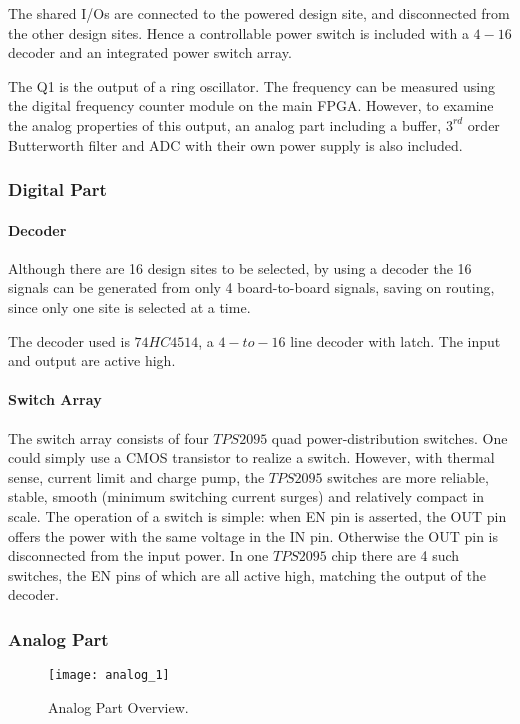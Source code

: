 The shared I/Os are connected to the powered design site, and disconnected from the other
design sites. Hence a controllable power switch is included with a $4-16$ decoder and an
integrated power switch array.

The Q1 is the output of a ring oscillator. The frequency can be measured using the digital
frequency counter module on the main FPGA. However, to examine the analog properties of this output,
an analog part including a buffer, $3^{rd}$ order Butterworth filter and ADC with their own power supply is also included.


\subsubsection{Digital Part}

\paragraph{Decoder}

Although there are 16 design sites to be selected, by using a decoder the 16
signals can be generated from only 4 board-to-board signals, saving on routing, since only one
site is selected at a time.

The decoder used is $74HC4514$, a $4-to-16$ line decoder with latch. The input and output are active high.

\paragraph{Switch Array}

The switch array consists of four $TPS2095$ quad power-distribution switches.
One could simply use a CMOS transistor to realize a switch. However, with thermal sense,
current limit and charge pump, the $TPS2095$ switches are more reliable, stable, smooth
(minimum switching current surges) and relatively compact in scale.
The operation of a switch is simple: when EN pin is asserted, the OUT pin offers
the power with the same voltage in the IN pin. Otherwise the OUT pin is disconnected
from the input power. In one $TPS2095$ chip there are 4 such switches, the EN pins of which are all active high, matching the output of the decoder.


\subsubsection{Analog Part}

\begin{figure}
 \centering
 \texttt{[image: analog\_1]}
 \caption{Analog Part Overview.}
 \label{fig:analog_overview}
\end{figure}

